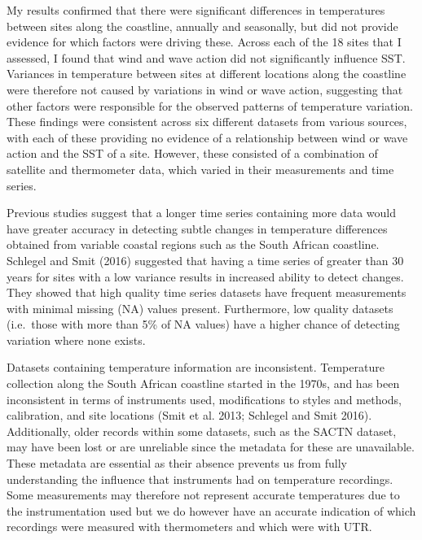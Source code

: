 \documentclass[12pt,]{article}
\begin{document}
My results confirmed that there were significant differences in
temperatures between sites along the coastline, annually and seasonally,
but did not provide evidence for which factors were driving these.
Across each of the 18 sites that I assessed, I found that wind and wave
action did not significantly influence SST. Variances in temperature
between sites at different locations along the coastline were therefore
not caused by variations in wind or wave action, suggesting that other
factors were responsible for the observed patterns of temperature
variation. These findings were consistent across six different datasets
from various sources, with each of these providing no evidence of a
relationship between wind or wave action and the SST of a site. However,
these consisted of a combination of satellite and thermometer data,
which varied in their measurements and time series.

Previous studies suggest that a longer time series containing more data
would have greater accuracy in detecting subtle changes in temperature
differences obtained from variable coastal regions such as the South
African coastline. Schlegel and Smit (2016) suggested that having a time
series of greater than 30 years for sites with a low variance results in
increased ability to detect changes. They showed that high quality time
series datasets have frequent measurements with minimal missing (NA)
values present. Furthermore, low quality datasets (i.e.~those with more
than 5\% of NA values) have a higher chance of detecting variation where
none exists.

Datasets containing temperature information are inconsistent.
Temperature collection along the South African coastline started in the
1970s, and has been inconsistent in terms of instruments used,
modifications to styles and methods, calibration, and site locations
(Smit et al. 2013; Schlegel and Smit 2016). Additionally, older records
within some datasets, such as the SACTN dataset, may have been lost or
are unreliable since the metadata for these are unavailable. These
metadata are essential as their absence prevents us from fully
understanding the influence that instruments had on temperature
recordings. Some measurements may therefore not represent accurate
temperatures due to the instrumentation used but we do however have an
accurate indication of which recordings were measured with thermometers
and which were with UTR.
\end{document}
